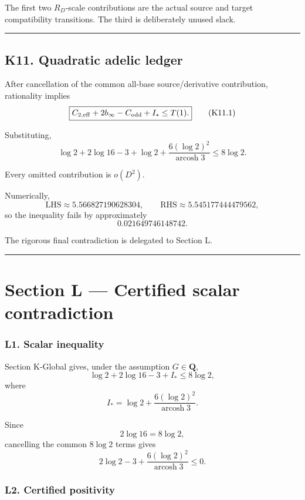 \documentclass[
  10pt,
  letterpaper,
]{article}
\theoremstyle{definition}
\theoremstyle{remark}
\begin{document}
The first two \(R_D\)-scale contributions are the actual source and
target compatibility transitions. The third is deliberately unused
slack.

\begin{center}\rule{0.5\linewidth}{0.5pt}\end{center}

\subsection{K11. Quadratic adelic
ledger}\label{k11.-quadratic-adelic-ledger}

After cancellation of the common all-base source/derivative
contribution, rationality implies \[
\boxed{
C_{2,\mathrm{eff}}
+
2b_\infty
-
C_{\rm odd}
+
I_*
\le
T(1).
}
\tag{K11.1}
\]

Substituting, \[
\boxed{
\log2+2\log16-3+
\log2+
\frac{6(\log2)^2}{\operatorname{arcosh}3}
\le8\log2.
}
\tag{K11.2}
\]

Every omitted contribution is \(o(D^2)\).

Numerically, \[
\mathrm{LHS}\approx5.566827190628304,
\qquad
\mathrm{RHS}\approx5.545177444479562,
\] so the inequality fails by approximately \[
0.021649746148742.
\]

The rigorous final contradiction is delegated to Section L.

\begin{center}\rule{0.5\linewidth}{0.5pt}\end{center}

\section{Section L --- Certified scalar
contradiction}\label{section-l-certified-scalar-contradiction}

\subsubsection{L1. Scalar inequality}\label{l1.-scalar-inequality}

Section K-Global gives, under the assumption \(G\in\mathbf Q\), \[
\log2+2\log16-3+I_*
\le8\log2,
\] where \[
I_*=
\log2+
\frac{6(\log2)^2}{\operatorname{arcosh}3}.
\]

Since \[
2\log16=8\log2,
\] cancelling the common \(8\log2\) terms gives \[
\boxed{
2\log2-3+
\frac{6(\log2)^2}{\operatorname{arcosh}3}
\le0.
}
\]

\subsubsection{L2. Certified positivity}\label{l2.-certified-positivity}
\end{document}
